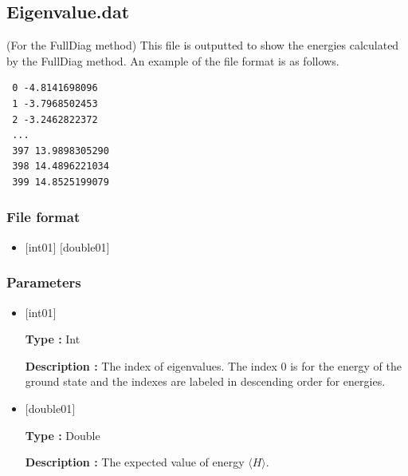 \newpage
\subsection{Eigenvalue.dat}
\label{Subsec:eigenvalue}
(For the FullDiag method) This file is outputted to show the energies calculated by the FullDiag method. An example of the file format is as follows.\\
\begin{minipage}{12.5cm}
\begin{screen}
\begin{verbatim}
 0 -4.8141698096 
 1 -3.7968502453 
 2 -3.2462822372 
 ...
 397 13.9898305290 
 398 14.4896221034 
 399 14.8525199079 
\end{verbatim}
\end{screen}
\end{minipage}

\subsubsection{File format}
 \begin{itemize}
   \item $[$int01$]$ $[$double01$]$ 
  \end{itemize}
\subsubsection{Parameters}
 \begin{itemize}

  \item  $[$int01$]$
  
 {\bf Type :} Int

{\bf Description :} The index of eigenvalues. The index 0 is for the energy of the ground state and the indexes are labeled in descending order for energies.

  \item  $[$double01$]$
  
 {\bf Type :} Double

{\bf Description :} The expected value of energy $\langle H \rangle$.
 
 \end{itemize}



\newpage
